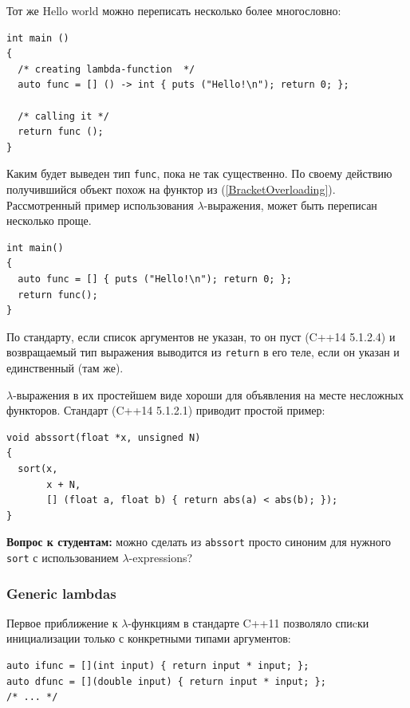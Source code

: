 \documentclass[a4paper,12pt,oneside]{article}
\newif\ifanswers
\begin{document}
Тот же Hello world можно переписать несколько более многословно:

\begin{lstlisting}
int main ()
{
  /* creating lambda-function  */
  auto func = [] () -> int { puts ("Hello!\n"); return 0; };

  /* calling it */
  return func (); 
}
\end{lstlisting}

Каким будет выведен тип \lstinline!func!, пока не так существенно. По своему действию получившийся объект похож на функтор из (\ref{BracketOverloading}). Рассмотренный пример использования $\lambda$-выражения, может быть переписан несколько проще.

\begin{lstlisting}
int main()
{
  auto func = [] { puts ("Hello!\n"); return 0; };
  return func(); 
}
\end{lstlisting}

По стандарту, если список аргументов не указан, то он пуст (C++14 5.1.2.4) и возвращаемый тип выражения выводится из \lstinline!return! в его теле, если он указан и единственный (там же).

$\lambda$-выражения в их простейшем виде хороши для объявления на месте несложных функторов. Стандарт (C++14 5.1.2.1) приводит простой пример:

\begin{lstlisting}
void abssort(float *x, unsigned N)
{
  sort(x, 
       x + N,
       [] (float a, float b) { return abs(a) < abs(b); });
}
\end{lstlisting}

\textbf{Вопрос к студентам:} можно сделать из \lstinline!abssort! просто синоним для нужного \lstinline!sort! с использованием $\lambda$-expressions?

\ifanswers
Правильный ответ: конечно и несложно \lstinline!auto abssort = [] (float *x, unsigned N) { /* ... */ }! тело то же самое
\fi

\subsubsection{Generic lambdas}\label{GenericLambdas}

Первое приближение к $\lambda$-функциям в стандарте C++11 позволяло спиcки инициализации только с конкретными типами аргументов:

\begin{lstlisting}
auto ifunc = [](int input) { return input * input; };
auto dfunc = [](double input) { return input * input; };
/* ... */
\end{lstlisting}
\end{document}
